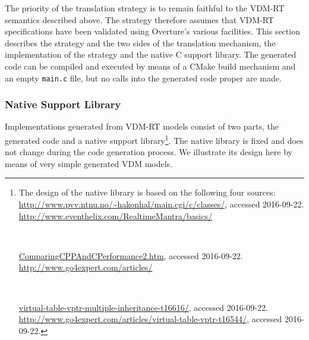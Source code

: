 The priority of the translation strategy is to remain faithful to the VDM-RT semantics described above.
%
The strategy therefore assumes that VDM-RT specifications have been validated using Overture's various facilities.
%
This section describes the strategy and the two sides of the translation mechanism, the implementation of the strategy and the native C support library.
%
The generated code can be compiled and executed by means of a CMake build mechanism and an empty \texttt{main.c} file, but no calls into the generated code proper are made.
%
%
%
%
%
%
\subsubsection{Native Support Library}
Implementations generated from VDM-RT models consist of two parts, the generated code and a native support library\footnote{The design of the native library is based on the following four sources:\\\url{http://www.pvv.ntnu.no/~hakonhal/main.cgi/c/classes/}, accessed 2016-09-22.\\\url{http://www.eventhelix.com/RealtimeMantra/basics/}\\\parbox{1cm}{~}\url{ComparingCPPAndCPerformance2.htm}, accessed 2016-09-22.\\\url{http://www.go4expert.com/articles/}\\\parbox{1cm}{~}\url{virtual-table-vptr-multiple-inheritance-t16616/}, accessed 2016-09-22.\\\url{http://www.go4expert.com/articles/virtual-table-vptr-t16544/}, accessed 2016-09-22.}.
%
The native library is fixed and does not change during the code generation process.
%
We illustrate its design here by means of very simple generated VDM models.

